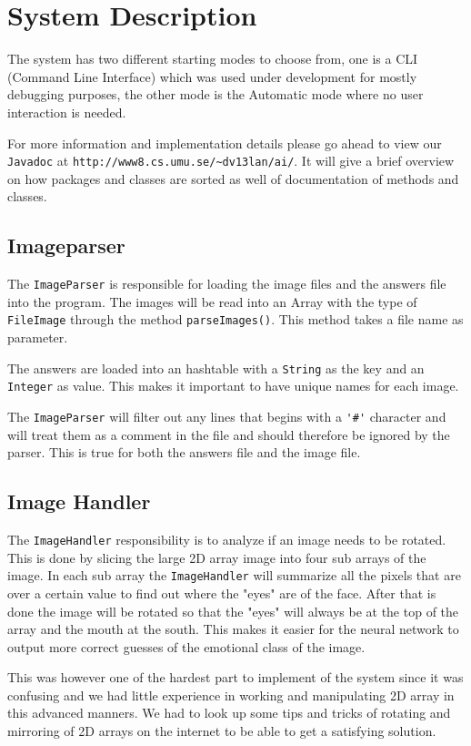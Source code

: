 \documentclass[a4paper, 12pt]{article}
\begin{document}
\section{System Description}
The system has two different starting modes to choose from, one is a CLI (Command Line Interface) which was used under development for mostly debugging purposes, the other mode is the Automatic mode where no user interaction is needed.

For more information and implementation details please go ahead to view our \verb|Javadoc| at \verb|http://www8.cs.umu.se/~dv13lan/ai/|. It will give a brief overview on how packages and classes are sorted as well of documentation of methods and classes.
\subsection{Imageparser}
The \verb|ImageParser| is responsible for loading the image files and the answers file into the program. The images will be read into an Array with the type of \verb|FileImage| through the method \verb|parseImages()|. This method takes a file name as parameter.

The answers are loaded into an hashtable with a \verb|String| as the key and an \verb|Integer| as value. This makes it important to have unique names for each image.



The \verb|ImageParser| will filter out any lines that begins with a \verb|'#'| character and will treat them as a comment in the file and should therefore be ignored by the parser. This is true for both the answers file and the image file.

\clearpage\subsection{Image Handler}
The \verb|ImageHandler| responsibility is to analyze if an image needs to be rotated. This is done by slicing the large 2D array image into four sub arrays of the image. In each sub array the \verb|ImageHandler| will summarize all the pixels that are over a certain value to find out where the "eyes" are of the face. After that is done the image will be rotated so that the "eyes" will always be at the top of the array and the mouth at the south. This makes it easier for the neural network to output more correct guesses of the emotional class of the image.

This was however one of the hardest part to implement of the system since it was confusing and we had little experience in working and manipulating 2D array in this advanced manners. We had to look up some tips and tricks of rotating and mirroring of 2D arrays on the internet to be able to get a satisfying solution.
\end{document}
